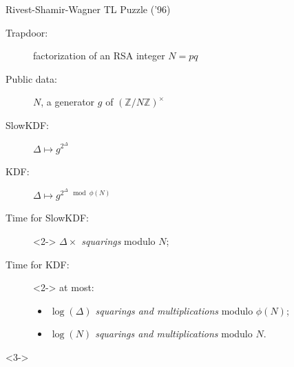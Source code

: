 \documentclass[aspectratio=169]{beamer}
\newcommand{\Z}{\mathbb{Z}}
\begin{document}
\begin{frame}{Rivest-Shamir-Wagner TL Puzzle ('96)}
  \begin{description}
  \item[Trapdoor:] factorization of an RSA integer $N=pq$
  \item[Public data:] $N$, a generator $g$ of $(\Z/N\Z)^\times$
  \item[SlowKDF:] $\Delta \mapsto g^{2^\Delta}$
  \item[KDF:] $\Delta \mapsto g^{2^\Delta \mod \phi(N)}$
    \bigskip
  \item[Time for SlowKDF:]<2-> \emph{$\Delta \times$ squarings} modulo $N$;
  \item[Time for KDF:]<2-> at most:
    \begin{itemize}
    \item \emph{$\log(\Delta)$ squarings and multiplications} modulo $\phi(N)$;
    \item \emph{$\log(N)$ squarings and multiplications} modulo $N$.
    \end{itemize}
  \end{description}

  \bigskip

  \begin{uncoverenv}<3->
    \centering
  \end{uncoverenv}
\end{frame}

\end{document}
